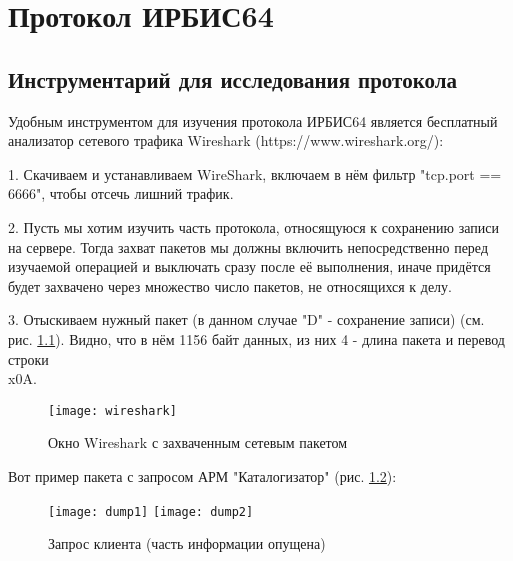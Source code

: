 \chapter{Протокол ИРБИС64}

\section{Инструментарий для исследования протокола}

Удобным инструментом для изучения протокола ИРБИС64 является бесплатный анализатор сетевого трафика Wireshark (https://www.wireshark.org/): 

1. Скачиваем и устанавливаем WireShark, включаем в нём фильтр "tcp.port == 6666", чтобы отсечь лишний трафик. 

2. Пусть мы хотим изучить часть протокола, относящуюся к сохранению записи на сервере. Тогда захват пакетов мы должны включить непосредственно перед изучаемой операцией и выключать сразу после её выполнения, иначе придётся будет захвачено через множество число пакетов, не относящихся к делу. 

3. Отыскиваем нужный пакет (в данном случае "D" - сохранение записи) (см. рис. \ref{wireshark}). Видно, что в нём 1156 байт данных, из них 4 - длина пакета и перевод строки \\x0A.

\begin{figure}[h]
	\centering
	\texttt{[image: wireshark]}
	\caption{Окно Wireshark с захваченным сетевым пакетом} \label{wireshark}
\end{figure}

Вот пример пакета с запросом АРМ "Каталогизатор" (рис. \ref{dump1}):

\begin{figure}[h]	
	\centering
	\texttt{[image: dump1]}
	\texttt{[image: dump2]}
	\caption{Запрос клиента (часть информации опущена)} \label{dump1}
\end{figure}

